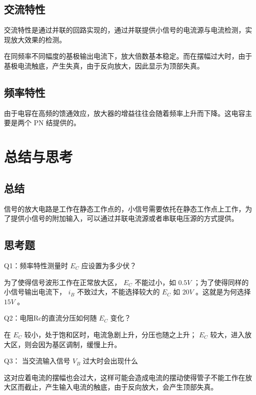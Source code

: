 \documentclass[lang=cn,11pt,a4paper,cite=authoryear]{elegantpaper}
\begin{document}
\subsection{交流特性}

交流特性是通过并联的回路实现的，通过并联提供小信号的电流源与电流检测，实现放大效果的检测。

在同频率不同幅度的基极输出电流下，放大倍数基本稳定。而在摆幅过大时，由于基极电流触底，产生失真，由于反向放大，因此显示为顶部失真。

\subsection{频率特性}

由于电容在高频的馈通效应，放大器的增益往往会随着频率上升而下降。这电容主要是两个 PN 结提供的。

\section{总结与思考}

\subsection{总结}

信号的放大电路是工作在静态工作点的，小信号需要依托在静态工作点上工作，为了提供小信号的附加输入，可以通过并联电流源或者串联电压源的方式提供。

\subsection{思考题}

Q1：频率特性测量时 \(E_C\) 应设置为多少伏？

为了使得信号波形工作在正常放大区， \(E_C\) 不能过小，如 \(0.5 V\) ；为了使得同样的小信号输出电流下， \(i_B\) 不致过大，不能选择较大的 \(E_C\) 如 \(20 V\) 。这就是为何选择 \(15 V\) 。

Q2：电阻Rc的直流分压如何随 \(E_C\) 变化？

在 \(E_C\) 较小，处于饱和区时，电流急剧上升，分压也随之上升； \(E_C\) 较大，进入放大区，则会因为基区调制，缓慢上升。

Q3： 当交流输入信号 \(V_B\) 过大时会出现什么

这对应着电流的摆幅也会过大，这样可能会造成电流的摆动使得管子不能工作在放大区而截止，产生输入电流的触底，由于反向放大，会产生顶部失真。


\end{document}
